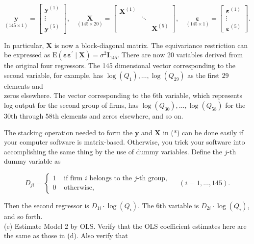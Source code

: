 \documentclass[10pt]{article}
\begin{document}
\[
\underset{(145 \times 1)}{\mathbf{y}}=\left[\begin{array}{c}
\mathbf{y}^{(1)}  \tag{*}\\
\vdots \\
\mathbf{y}^{(5)}
\end{array}\right], \quad \underset{(145 \times 20)}{\mathbf{X}}=\left[\begin{array}{lll}
\mathbf{X}^{(1)} & & \\
& \ddots & \\
& & \mathbf{X}^{(5)}
\end{array}\right], \quad \underset{(145 \times 1)}{\boldsymbol{\varepsilon}}=\left[\begin{array}{c}
\boldsymbol{\varepsilon}^{(1)} \\
\vdots \\
\boldsymbol{\varepsilon}^{(5)}
\end{array}\right] .
\]

In particular, $\mathbf{X}$ is now a block-diagonal matrix. The equivariance restriction can be expressed as $\mathrm{E}\left(\boldsymbol{\varepsilon} \boldsymbol{\varepsilon}^{\prime} \mid \mathbf{X}\right)=\sigma^{2} \mathbf{I}_{145}$. There are now 20 variables derived from the original four regressors. The 145 dimensional vector corresponding to the second variable, for example, has $\log \left(Q_{1}\right), \ldots, \log \left(Q_{29}\right)$ as the first 29 elements and\\
zeros elsewhere. The vector corresponding to the 6th variable, which represents log output for the second group of firms, has $\log \left(Q_{30}\right), \ldots, \log \left(Q_{58}\right)$ for the 30th through 58th elements and zeros elsewhere, and so on.

The stacking operation needed to form the $\mathbf{y}$ and $\mathbf{X}$ in (*) can be done easily if your computer software is matrix-based. Otherwise, you trick your software into accomplishing the same thing by the use of dummy variables. Define the $j$-th dummy variable as

$$
D_{j i}=\left\{\begin{array}{ll}
1 & \text { if firm } i \text { belongs to the } j \text {-th group, } \\
0 & \text { otherwise, }
\end{array} \quad(i=1, \ldots, 145) .\right.
$$

Then the second regressor is $D_{1 i} \cdot \log \left(Q_{i}\right)$. The 6th variable is $D_{2 i} \cdot \log \left(Q_{i}\right)$, and so forth.\\
(e) Estimate Model 2 by OLS. Verify that the OLS coefficient estimates here are the same as those in (d). Also verify that
\end{document}
